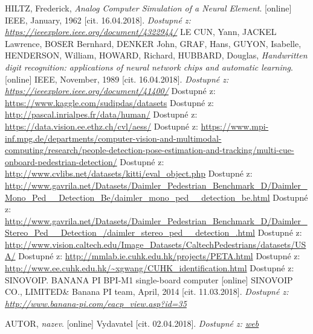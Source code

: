 \begin{thebibliography}{99}
	 HILTZ, Frederick, \textit{Analog Computer Simulation of a Neural Element}. [online] IEEE, January, 1962 [cit. 16.04.2018]. 
 	\textit{Dostupné z: \url{https://ieeexplore.ieee.org/document/4322944/}}
 	 LE CUN, Yann, JACKEL Lawrence, BOSER Bernhard, DENKER John, GRAF, Hans, GUYON, Isabelle, HENDERSON, William, HOWARD, Richard, HUBBARD, Douglas, \textit{Handwritten digit recognition: applications of neural network chips and automatic learning}. [online] IEEE, November, 1989 [cit. 16.04.2018]. 
 	\textit{Dostupné z: \url{https://ieeexplore.ieee.org/document/41400/}}
 	 Dostupné z: \url{https://www.kaggle.com/sudipdas/datasets}
 	 Dostupné z: \url{http://pascal.inrialpes.fr/data/human/}
 	 Dostupné z: \url{https://data.vision.ee.ethz.ch/cvl/aess/}
 	 Dostupné z: \url{https://www.mpi-inf.mpg.de/departments/computer-vision-and-multimodal-computing/research/people-detection-pose-estimation-and-tracking/multi-cue-onboard-pedestrian-detection/}
 	 Dostupné z: \url{http://www.cvlibs.net/datasets/kitti/eval_object.php}
 	 Dostupné z: \url{http://www.gavrila.net/Datasets/Daimler_Pedestrian_Benchmark_D/Daimler_Mono_Ped__Detection_Be/daimler_mono_ped__detection_be.html}
 	 Dostupné z: \url{http://www.gavrila.net/Datasets/Daimler_Pedestrian_Benchmark_D/Daimler_Stereo_Ped__Detection_/daimler_stereo_ped__detection_.html}
 	 Dostupné z: \url{http://www.vision.caltech.edu/Image_Datasets/CaltechPedestrians/datasets/USA/}
 	 Dostupné z: \url{http://mmlab.ie.cuhk.edu.hk/projects/PETA.html}
 	 Dostupné z: \url{http://www.ee.cuhk.edu.hk/~xgwang/CUHK_identification.html}
 	\bibitem{} Dostupné z: \url{}
	 SINOVOIP. BANANA PI BPI-M1 single-board computer [online] SINOVOIP CO., LIMITED\& Banana PI team, April, 2014  [cit. 11.03.2018]. 
		\textit{Dostupné z: \url{http://www.banana-pi.com/eacp_view.asp?id=35}}
 
 \bibitem{} AUTOR, \textit{nazev}. [online] Vydavatel [cit. 02.04.2018]. 
 	\textit{Dostupné z: \url{web}}
\end{thebibliography}
